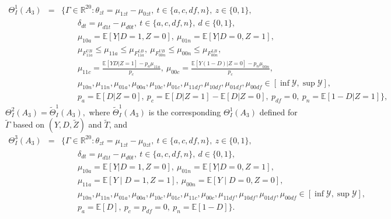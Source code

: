 \documentclass[12pt]{article}
\theoremstyle{plain}
\theoremstyle{definition}
\theoremstyle{remark}
\begin{document}
\begin{eqnarray*}
    \Theta_I^1(A_3) &=& \Bigg \{\Gamma \in \mathbb R^{20}: \theta_{zt}=\mu_{1zt}-\mu_{0zt},\ t\in \{a,c,df,n\},\ z\in \{0,1\},\\ 
    && \qquad \delta_{dt} = \mu_{d1t}-\mu_{d0t},\ t\in \{a,c,df,n\},\ d\in\{0,1\},\\
   && \qquad \mu_{10a}=\mathbb E[Y\vert D=1, Z=0],\ \mu_{01n}=\mathbb E[Y\vert D=0,Z=1],\\
   && \qquad \mu_{F_{11a}^{UB}} \leq \mu_{11a} \leq \mu_{F_{11a}^{LB}},\ \mu_{F_{00n}^{UB}} \leq \mu_{00n} \leq \mu_{F_{00n}^{LB}},\\
   && \qquad \mu_{11c} = \frac{\mathbb E[Y D \vert Z=1]- p_a \mu_{11a}}{p_c},\ \mu_{00c} = \frac{\mathbb E[Y (1-D) \vert Z=0]- p_n \mu_{00n}}{p_c},\\
   && \qquad \mu_{10n}, \mu_{11n}, \mu_{01a}, \mu_{00a}, \mu_{10c}, \mu_{01c}, \mu_{11df}, \mu_{10df}, \mu_{01df}, \mu_{00df} \in [\inf \mathcal Y, \sup \mathcal Y],\\
   && \qquad p_a=\mathbb{E}[D  \vert  Z=0],\ p_c=\mathbb{E}[D  \vert  Z=1] - \mathbb{E}[D  \vert  Z=0],\ p_{df}=0,\  p_n=\mathbb{E}[1-D  \vert  Z=1]  
   \Bigg \},
\end{eqnarray*}
$\Theta_I^2(A_3)=\tilde{\Theta}_I^1(A_3),$ where $\tilde{\Theta}_I^1(A_3)$ is the corresponding $\Theta_I^1(A_3)$ defined for $\tilde{\Gamma}$ based on $(Y,D,\tilde{Z})$ and $\tilde{T}$, 
and
\begin{eqnarray*}
    \Theta_I^3(A_3) &=& \Bigg \{\Gamma \in \mathbb R^{20}: \theta_{zt}=\mu_{1zt}-\mu_{0zt},\ t\in \{a,c,df,n\},\ z\in \{0,1\},\\ 
    && \qquad \delta_{dt} = \mu_{d1t}-\mu_{d0t},\ t\in \{a,c,df,n\},\ d\in\{0,1\},\\ 
   && \qquad \mu_{10a}=\mathbb E[Y\vert D=1, Z=0],\ \mu_{01n}=\mathbb E[Y\vert D=0,Z=1],\\
   &&\qquad \mu_{11a} = \mathbb{E}[Y \mid D = 1, Z = 1],\ \mu_{00n} = \mathbb{E}[Y \mid D = 0, Z = 0],\\
   && \qquad \mu_{10n}, \mu_{11n}, \mu_{01a}, \mu_{00a}, \mu_{10c}, \mu_{01c}, \mu_{11c}, \mu_{00c}, \mu_{11df}, \mu_{10df}, \mu_{01df}, \mu_{00df} \in [\inf \mathcal Y, \sup \mathcal Y],\\
   && \qquad p_a=\mathbb{E}[D],\ p_c=p_{df}=0,\  p_n=\mathbb{E}[1-D]  
   \Bigg \}.
\end{eqnarray*}




\end{document}
